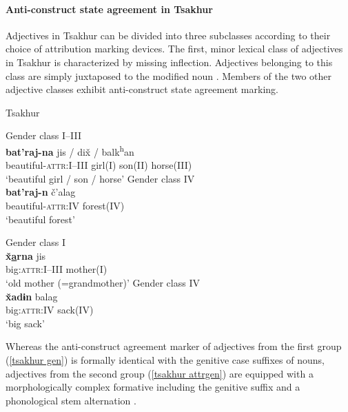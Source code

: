 \paragraph{Anti-construct state agreement in Tsakhur}
Adjectives in Tsakhur can be divided into three subclasses according to their choice of attribution marking devices. The first, minor lexical class of adjectives in Tsakhur is characterized by missing inflection. Adjectives belonging to this class are simply juxtaposed to the modified noun \citep[383]{talibov2004}. Members of the two other adjective classes exhibit anti-construct state agreement marking.
\begin{exe}
\ex 
\rm{Tsakhur \citep[382]{talibov2004}}
\begin{xlist}
\ex	
\label{tsakhur gen}
\begin{xlist}
\ex \rm{Gender class I–III}\\
\gll	\textbf{bat'raj-na} jis / dix̌ / balk\textsuperscript{h}an\\
	 beautiful-\textsc{attr:I–III} girl(\textsc{I}) { } son(\textsc{II}) { } horse(\textsc{III})\\
\glt	 ‘beautiful girl / son / horse’
\ex \rm{Gender class IV}\\
\gll	\textbf{bat'raj-n}	č'alag\\
	beautiful-\textsc{attr:IV} forest(\textsc{IV})\\
\glt	‘beautiful forest’
\end{xlist}
\ex 
\label{tsakhur attrgen}
\begin{xlist}
\ex \rm{Gender class I}\\
\gll	\textbf{x̌\underline{a}rna} jis\\
	big:\textsc{attr:I–III} mother(\textsc{I})\\
\glt	‘old mother (=grandmother)’
\ex \rm{Gender class IV}\\
\gll	\textbf{x̌adɨn} balag\\
	big:\textsc{attr:IV} sack(\textsc{IV})\\
\glt	‘big sack’
\end{xlist}
\end{xlist}
\end{exe}
Whereas the anti-construct agreement marker of adjectives from the first group (\ref{tsakhur gen}) is formally identical with the genitive case suffixes of nouns, adjectives from the second group (\ref{tsakhur attrgen}) are equipped with a morphologically complex formative including the genitive suffix and a phonological stem alternation \citep[382]{talibov2004}.

